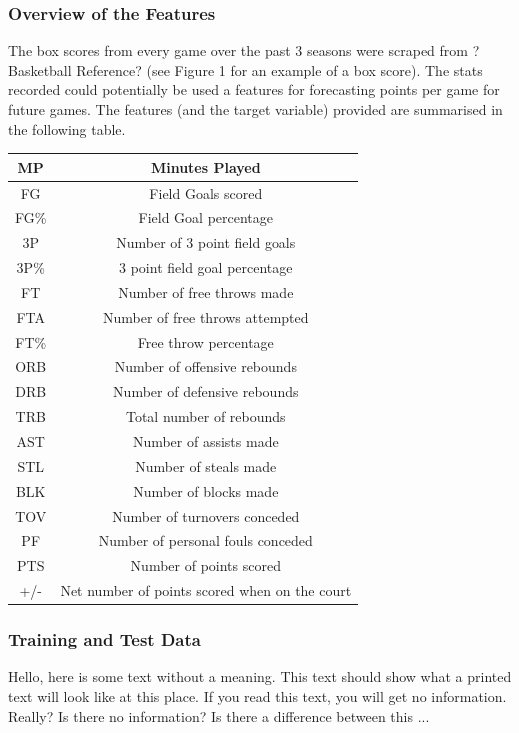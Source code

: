 \documentclass[a4paper,11pt,twoside]{article}
\begin{document}
 \subsubsection{Overview of the Features}
The box scores from every game over the past 3 seasons  were scraped from ?Basketball Reference? (see Figure 1 for an example of a box score). The stats recorded could potentially be used a features for forecasting points per game for future games. The features (and the target variable) provided are summarised in the following table. 

\vspace{5mm}
\begin{center}
\begin{tabular}{ |c|c| } 
 \hline
MP & Minutes Played  \\ 
 \hline
FG & Field Goals scored \\ 
 \hline
FG\% & Field Goal percentage\\ 
 \hline
3P & Number of 3 point field goals\\
 \hline
 3P\% & 3 point field goal percentage\\
\hline
FT & Number of free throws made\\
\hline
FTA & Number of free throws attempted\\
\hline
FT\% & Free throw percentage\\
\hline
ORB & Number of offensive rebounds\\
\hline
DRB & Number of defensive rebounds\\
\hline
TRB & Total number of rebounds\\
\hline
AST & Number of assists made\\
\hline
STL & Number of steals made\\
\hline
BLK & Number of blocks made\\
\hline
TOV & Number of turnovers conceded\\
\hline
PF & Number of personal fouls conceded\\
\hline
PTS & Number of points scored\\
\hline
+/- & Net number of points scored when on the court\\
\hline
\end{tabular}
\end{center}
\vspace{5mm}


 \subsubsection{Training and Test Data}
 Hello,  here  is  some  text  without  a  meaning.   This  
text  should  show  what  a printed text will look like at 
this place.  If you read this text, you will get no information.  
Really?  Is there no information?  Is there a difference between 
this ... 
\end{document}
